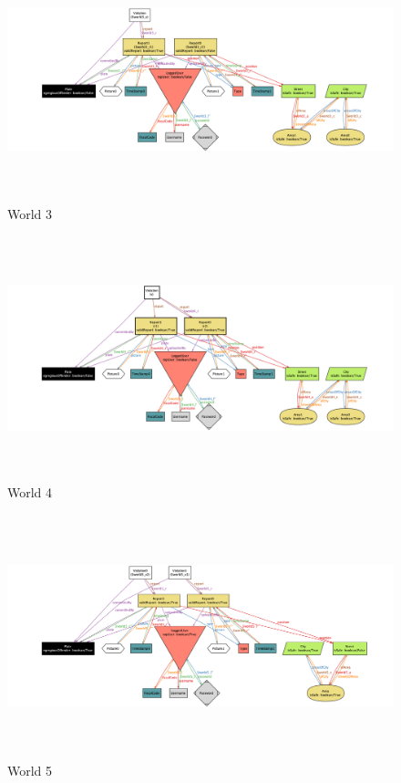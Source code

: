 \begin{figure}[h!]
	\centering
	\includegraphics [height=200pt,angle=-90]{alloy/world3.png}
	\caption{
		\label{fig:World3} 
		World 3
	}
\end{figure}

\begin{figure}[h!]
	\centering
	\includegraphics [height=200pt,angle=-90]{alloy/world4.png}
	\caption{
		\label{fig:World4} 
		World 4
	}
\end{figure}

\begin{figure}[h!]
	\centering
	\includegraphics [height=200pt,angle=-90]{alloy/world5.png}
	\caption{
		\label{fig:World5} 
		World 5
	}
\end{figure}

